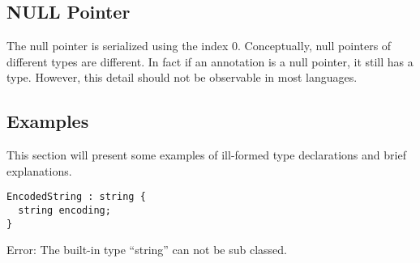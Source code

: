 \subsection{NULL Pointer}

The null pointer is serialized using the index 0. Conceptually, null pointers of different types are different. In fact if an annotation is a null pointer, it still has a type. However, this detail should not be observable in most languages.


\subsection{Examples}

This section will present some examples of ill-formed type declarations and brief explanations.

\begin{lstlisting}[label=stringExample,caption=Legal Super Types,language=skill]
EncodedString : string {
  string encoding;
}
\end{lstlisting}
Error: The built-in type ``string'' can not be sub classed.
